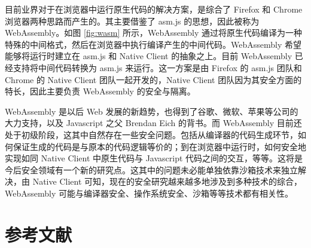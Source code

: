 \documentclass[final,12pt]{elsarticle}
\begin{document}
目前业界对于在浏览器中运行原生代码的解决方案，是综合了 Firefox 和 Chrome 浏览器两种思路而产生的。其主要借鉴了 asm.js 的思想，因此被称为 WebAssembly。如图 \ref{fig:wasm} 所示，WebAssembly 通过将原生代码编译为一种特殊的中间格式，然后在浏览器中执行编译产生的中间代码。WebAssembly 希望能够将运行时建立在 asm.js 和 Native Client 的抽象之上。目前 WebAssembly 已经支持将中间代码转换为 asm.js 来运行。这一方案是由 Firefox 的 asm.js 团队和 Chrome 的 Native Client 团队一起开发的，Native Client 团队因为其安全方面的特长，因此主要负责 WebAssembly 的安全与隔离。

WebAssembly 是以后 Web 发展的新趋势，也得到了谷歌、微软、苹果等公司的大力支持，以及 Javascript 之父 Brendan Eich 的背书。而 WebAssembly 目前还处于初级阶段，这其中自然存在一些安全问题。包括从编译器的代码生成环节，如何保证生成的代码是与原本的代码逻辑等价的；到在浏览器中运行时，如何安全地实现如同 Native Client 中原生代码与 Javascript 代码之间的交互，等等。这将是今后安全领域有一个新的研究点。这其中的问题未必能单独依靠沙箱技术来独立解决，由 Native Client 可知，现在的安全研究越来越多地涉及到多种技术的综合，WebAssembly 可能与编译器安全、操作系统安全、沙箱等等技术都有相关性。


\clearpage

\section*{参考文献}





 

\end{document}
